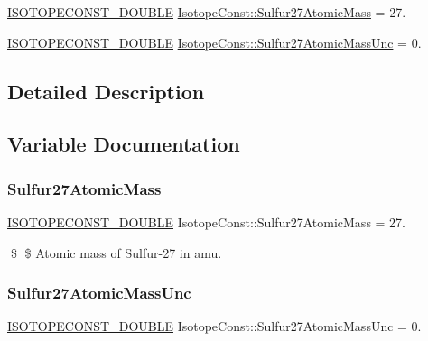 \begin{DoxyCompactItemize}
\item 
\mbox{\hyperlink{group___isotope_const-_macros_ga8f45a7272ce02c0b4c65c44636ed719a}{I\+S\+O\+T\+O\+P\+E\+C\+O\+N\+S\+T\+\_\+\+D\+O\+U\+B\+LE}} \mbox{\hyperlink{group___isotope_const-_sulfur-_s27_ga4665ae4c94e070a1288774734e069fe7}{Isotope\+Const\+::\+Sulfur27\+Atomic\+Mass}} = 27.
\item 
\mbox{\hyperlink{group___isotope_const-_macros_ga8f45a7272ce02c0b4c65c44636ed719a}{I\+S\+O\+T\+O\+P\+E\+C\+O\+N\+S\+T\+\_\+\+D\+O\+U\+B\+LE}} \mbox{\hyperlink{group___isotope_const-_sulfur-_s27_ga159ed166a3cc83f0e818395c1397003f}{Isotope\+Const\+::\+Sulfur27\+Atomic\+Mass\+Unc}} = 0.
\end{DoxyCompactItemize}


\subsection{Detailed Description}


\subsection{Variable Documentation}
\mbox{\label{group___isotope_const-_sulfur-_s27_ga4665ae4c94e070a1288774734e069fe7}} 
\subsubsection{\texorpdfstring{Sulfur27\+Atomic\+Mass}{Sulfur27AtomicMass}}
{\footnotesize\ttfamily \mbox{\hyperlink{group___isotope_const-_macros_ga8f45a7272ce02c0b4c65c44636ed719a}{I\+S\+O\+T\+O\+P\+E\+C\+O\+N\+S\+T\+\_\+\+D\+O\+U\+B\+LE}} Isotope\+Const\+::\+Sulfur27\+Atomic\+Mass = 27.}

\$ \$ Atomic mass of Sulfur-\/27 in amu. \mbox{\label{group___isotope_const-_sulfur-_s27_ga159ed166a3cc83f0e818395c1397003f}} 
\subsubsection{\texorpdfstring{Sulfur27\+Atomic\+Mass\+Unc}{Sulfur27AtomicMassUnc}}
{\footnotesize\ttfamily \mbox{\hyperlink{group___isotope_const-_macros_ga8f45a7272ce02c0b4c65c44636ed719a}{I\+S\+O\+T\+O\+P\+E\+C\+O\+N\+S\+T\+\_\+\+D\+O\+U\+B\+LE}} Isotope\+Const\+::\+Sulfur27\+Atomic\+Mass\+Unc = 0.}


